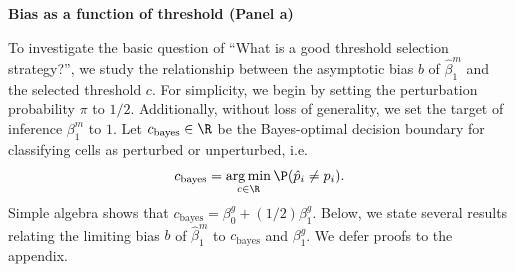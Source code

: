 \documentclass[12pt]{article}
\DeclareMathOperator*{\argmin}{arg\,min}
\begin{document}
\begin{center}
\textbf{Bias as a function of threshold (Panel a)}
\end{center}

To investigate the basic question of ``What is a good threshold selection strategy?'', we study the relationship between the asymptotic bias $b$ of $\hat{\beta}^m_1$ and the selected threshold $c$. For simplicity, we begin by setting the perturbation probability $\pi$ to $1/2$. Additionally, without loss of generality, we set the target of inference $\beta^m_1$ to $1$. Let $c_\textrm{bayes} \in \R$ be the Bayes-optimal decision boundary for classifying cells as perturbed or unperturbed, i.e. $$c_\textrm{bayes} = \argmin_{c \in \R} \P(\hat{p}_i \neq p_i).$$ Simple algebra shows that $c_\textrm{bayes} = \beta_0^g + (1/2) \beta^g_1.$ Below, we state several results relating the limiting bias $b$ of $\hat{\beta}^m_1$ to $c_\textrm{bayes}$ and $\beta^g_1$. We defer proofs to the appendix.
\end{document}

